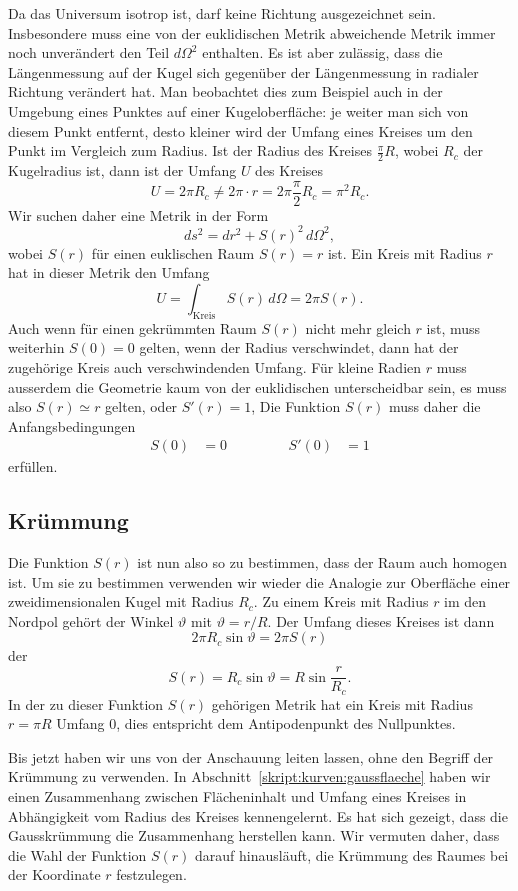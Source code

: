 Da das Universum isotrop ist, darf keine Richtung ausgezeichnet sein.
Insbesondere muss eine von der euklidischen Metrik abweichende
Metrik immer noch unverändert den Teil $d\Omega^2$ enthalten.
Es ist aber zulässig, dass die Längenmessung auf der Kugel sich
gegenüber der Längenmessung in radialer Richtung verändert hat.
Man beobachtet dies zum Beispiel auch in der Umgebung eines Punktes
auf einer Kugeloberfläche: je weiter man sich von diesem Punkt entfernt,
desto kleiner wird der Umfang eines Kreises um den Punkt im Vergleich
zum Radius. 
Ist der Radius des Kreises $\frac{\pi}2R$, wobei $R_c$ der Kugelradius ist,
dann ist der Umfang $U$ des Kreises
\[
U=2\pi R_c \ne 2\pi \cdot r = 2\pi\frac{\pi}2R_c=\pi^2 R_c.
\]
Wir suchen daher eine Metrik in der Form
\[
ds^2 
=
dr^2 + S(r)^2 \,d\Omega^2,
\]
wobei $S(r)$ für einen euklischen Raum $S(r)=r$ ist.
Ein Kreis mit Radius $r$ hat in dieser Metrik den Umfang
\[
U=\int_{\textrm{Kreis}} S(r)\,d\Omega = 2\pi S(r).
\]
Auch wenn für einen gekrümmten Raum $S(r)$ nicht mehr gleich $r$ ist,
muss weiterhin $S(0)=0$ gelten, wenn der Radius verschwindet, dann
hat der zugehörige Kreis auch verschwindenden Umfang.
Für kleine Radien $r$ muss ausserdem die Geometrie kaum von der
euklidischen unterscheidbar sein, es muss also $S(r)\simeq r$ gelten,
oder $S'(r)=1$,
Die Funktion $S(r)$ muss daher die Anfangsbedingungen
\begin{equation}
\begin{aligned}
S(0)&=0&&\qquad&S'(0)&=1
\end{aligned}
\label{skript:rwmetrik:Safangsbedingungen}
\end{equation}
erfüllen.


\subsection{Krümmung}
Die Funktion $S(r)$ ist nun also so zu bestimmen, dass der Raum auch
homogen ist.
Um sie zu bestimmen verwenden wir wieder die Analogie zur Oberfläche
einer zweidimensionalen Kugel mit Radius $R_c$.
Zu einem Kreis mit Radius $r$ im den Nordpol gehört der Winkel
$\vartheta$ mit $\vartheta = r/R$.
Der Umfang dieses Kreises ist dann
\[
2\pi R_c\sin\vartheta
=
2\pi S(r)
\]
der
\[
S(r) = R_c\sin\vartheta=R\sin\frac{r}{R_c}.
\]
In der zu dieser Funktion $S(r)$ gehörigen Metrik hat ein Kreis mit 
Radius $r=\pi R$ Umfang $0$, dies entspricht dem Antipodenpunkt des
Nullpunktes.

Bis jetzt haben wir uns von der Anschauung leiten lassen, ohne den
Begriff der Krümmung zu verwenden.
In Abschnitt~\ref{skript:kurven:gaussflaeche} haben wir 
einen Zusammenhang zwischen Flächeninhalt und Umfang eines Kreises
in Abhängigkeit vom Radius des Kreises kennengelernt.
Es hat sich gezeigt, dass die Gausskrümmung die Zusammenhang herstellen
kann.
Wir vermuten daher, dass die Wahl der Funktion $S(r)$ darauf hinausläuft,
die Krümmung des Raumes bei der Koordinate $r$ festzulegen.

